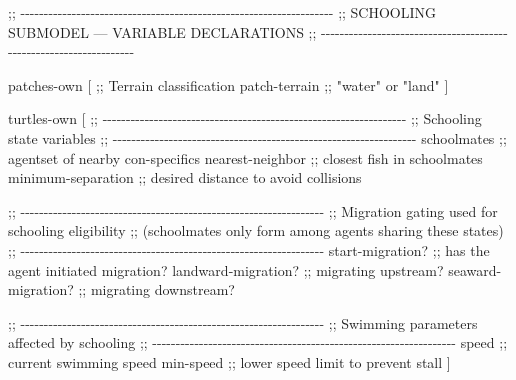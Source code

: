 \documentclass[
]{book}
\newenvironment{Shaded}{\begin{snugshade}}{\end{snugshade}}
\newcommand{\NormalTok}[1]{#1}
\begin{document}
\begin{Shaded}
\begin{Highlighting}[]
\NormalTok{;; {-}{-}{-}{-}{-}{-}{-}{-}{-}{-}{-}{-}{-}{-}{-}{-}{-}{-}{-}{-}{-}{-}{-}{-}{-}{-}{-}{-}{-}{-}{-}{-}{-}{-}{-}{-}{-}{-}{-}{-}{-}{-}{-}{-}{-}{-}{-}{-}{-}{-}{-}{-}{-}{-}{-}{-}{-}{-}{-}{-}{-}{-}{-}{-}{-}{-}{-}}
\NormalTok{;;  SCHOOLING SUBMODEL — VARIABLE DECLARATIONS}
\NormalTok{;; {-}{-}{-}{-}{-}{-}{-}{-}{-}{-}{-}{-}{-}{-}{-}{-}{-}{-}{-}{-}{-}{-}{-}{-}{-}{-}{-}{-}{-}{-}{-}{-}{-}{-}{-}{-}{-}{-}{-}{-}{-}{-}{-}{-}{-}{-}{-}{-}{-}{-}{-}{-}{-}{-}{-}{-}{-}{-}{-}{-}{-}{-}{-}{-}{-}{-}{-}}

\NormalTok{patches{-}own [}
\NormalTok{  ;; Terrain classification}
\NormalTok{  patch{-}terrain          ;; "water" or "land"}
\NormalTok{]}

\NormalTok{turtles{-}own [}
\NormalTok{  ;; {-}{-}{-}{-}{-}{-}{-}{-}{-}{-}{-}{-}{-}{-}{-}{-}{-}{-}{-}{-}{-}{-}{-}{-}{-}{-}{-}{-}{-}{-}{-}{-}{-}{-}{-}{-}{-}{-}{-}{-}{-}{-}{-}{-}{-}{-}{-}{-}{-}{-}{-}{-}{-}{-}{-}{-}{-}{-}{-}{-}{-}{-}{-}{-}{-}}
\NormalTok{  ;; Schooling state variables}
\NormalTok{  ;; {-}{-}{-}{-}{-}{-}{-}{-}{-}{-}{-}{-}{-}{-}{-}{-}{-}{-}{-}{-}{-}{-}{-}{-}{-}{-}{-}{-}{-}{-}{-}{-}{-}{-}{-}{-}{-}{-}{-}{-}{-}{-}{-}{-}{-}{-}{-}{-}{-}{-}{-}{-}{-}{-}{-}{-}{-}{-}{-}{-}{-}{-}{-}{-}{-}}
\NormalTok{  schoolmates            ;; agentset of nearby con{-}specifics}
\NormalTok{  nearest{-}neighbor       ;; closest fish in schoolmates}
\NormalTok{  minimum{-}separation     ;; desired distance to avoid collisions}

\NormalTok{  ;; {-}{-}{-}{-}{-}{-}{-}{-}{-}{-}{-}{-}{-}{-}{-}{-}{-}{-}{-}{-}{-}{-}{-}{-}{-}{-}{-}{-}{-}{-}{-}{-}{-}{-}{-}{-}{-}{-}{-}{-}{-}{-}{-}{-}{-}{-}{-}{-}{-}{-}{-}{-}{-}{-}{-}{-}{-}{-}{-}{-}{-}{-}{-}{-}{-}}
\NormalTok{  ;; Migration gating used for schooling eligibility}
\NormalTok{  ;; (schoolmates only form among agents sharing these states)}
\NormalTok{  ;; {-}{-}{-}{-}{-}{-}{-}{-}{-}{-}{-}{-}{-}{-}{-}{-}{-}{-}{-}{-}{-}{-}{-}{-}{-}{-}{-}{-}{-}{-}{-}{-}{-}{-}{-}{-}{-}{-}{-}{-}{-}{-}{-}{-}{-}{-}{-}{-}{-}{-}{-}{-}{-}{-}{-}{-}{-}{-}{-}{-}{-}{-}{-}{-}{-}}
\NormalTok{  start{-}migration?       ;; has the agent initiated migration?}
\NormalTok{  landward{-}migration?    ;; migrating upstream?}
\NormalTok{  seaward{-}migration?     ;; migrating downstream?}

\NormalTok{  ;; {-}{-}{-}{-}{-}{-}{-}{-}{-}{-}{-}{-}{-}{-}{-}{-}{-}{-}{-}{-}{-}{-}{-}{-}{-}{-}{-}{-}{-}{-}{-}{-}{-}{-}{-}{-}{-}{-}{-}{-}{-}{-}{-}{-}{-}{-}{-}{-}{-}{-}{-}{-}{-}{-}{-}{-}{-}{-}{-}{-}{-}{-}{-}{-}{-}}
\NormalTok{  ;; Swimming parameters affected by schooling}
\NormalTok{  ;; {-}{-}{-}{-}{-}{-}{-}{-}{-}{-}{-}{-}{-}{-}{-}{-}{-}{-}{-}{-}{-}{-}{-}{-}{-}{-}{-}{-}{-}{-}{-}{-}{-}{-}{-}{-}{-}{-}{-}{-}{-}{-}{-}{-}{-}{-}{-}{-}{-}{-}{-}{-}{-}{-}{-}{-}{-}{-}{-}{-}{-}{-}{-}{-}{-}}
\NormalTok{  speed                  ;; current swimming speed}
\NormalTok{  min{-}speed              ;; lower speed limit to prevent stall}
\NormalTok{]}


\end{Highlighting}
\end{Shaded}
\end{document}

